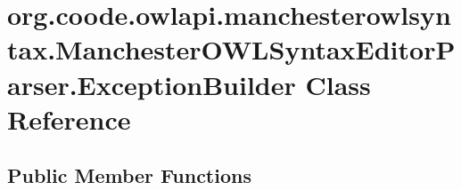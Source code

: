 \hypertarget{classorg_1_1coode_1_1owlapi_1_1manchesterowlsyntax_1_1_manchester_o_w_l_syntax_editor_parser_1_1_exception_builder}{\section{org.\-coode.\-owlapi.\-manchesterowlsyntax.\-Manchester\-O\-W\-L\-Syntax\-Editor\-Parser.\-Exception\-Builder Class Reference}
\label{classorg_1_1coode_1_1owlapi_1_1manchesterowlsyntax_1_1_manchester_o_w_l_syntax_editor_parser_1_1_exception_builder}
}
\subsection*{Public Member Functions}
